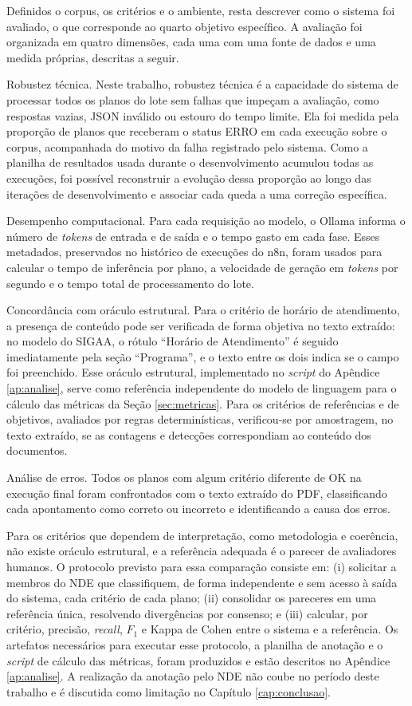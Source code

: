 Definidos o corpus, os critérios e o ambiente, resta descrever como o sistema foi avaliado, o que corresponde ao quarto objetivo específico. A avaliação foi organizada em quatro dimensões, cada uma com uma fonte de dados e uma medida próprias, descritas a seguir.

Robustez técnica. Neste trabalho, robustez técnica é a capacidade do sistema de processar todos os planos do lote sem falhas que impeçam a avaliação, como respostas vazias, JSON inválido ou estouro do tempo limite. Ela foi medida pela proporção de planos que receberam o status ERRO em cada execução sobre o corpus, acompanhada do motivo da falha registrado pelo sistema. Como a planilha de resultados usada durante o desenvolvimento acumulou todas as execuções, foi possível reconstruir a evolução dessa proporção ao longo das iterações de desenvolvimento e associar cada queda a uma correção específica.

Desempenho computacional. Para cada requisição ao modelo, o Ollama informa o número de \textit{tokens} de entrada e de saída e o tempo gasto em cada fase. Esses metadados, preservados no histórico de execuções do n8n, foram usados para calcular o tempo de inferência por plano, a velocidade de geração em \textit{tokens} por segundo e o tempo total de processamento do lote.

Concordância com oráculo estrutural. Para o critério de horário de atendimento, a presença de conteúdo pode ser verificada de forma objetiva no texto extraído: no modelo do SIGAA, o rótulo ``Horário de Atendimento'' é seguido imediatamente pela seção ``Programa'', e o texto entre os dois indica se o campo foi preenchido. Esse oráculo estrutural, implementado no \textit{script} do Apêndice \ref{ap:analise}, serve como referência independente do modelo de linguagem para o cálculo das métricas da Seção \ref{sec:metricas}. Para os critérios de referências e de objetivos, avaliados por regras determinísticas, verificou-se por amostragem, no texto extraído, se as contagens e detecções correspondiam ao conteúdo dos documentos.

Análise de erros. Todos os planos com algum critério diferente de OK na execução final foram confrontados com o texto extraído do PDF, classificando cada apontamento como correto ou incorreto e identificando a causa dos erros.

Para os critérios que dependem de interpretação, como metodologia e coerência, não existe oráculo estrutural, e a referência adequada é o parecer de avaliadores humanos. O protocolo previsto para essa comparação consiste em: (i) solicitar a membros do NDE que classifiquem, de forma independente e sem acesso à saída do sistema, cada critério de cada plano; (ii) consolidar os pareceres em uma referência única, resolvendo divergências por consenso; e (iii) calcular, por critério, precisão, \textit{recall}, $F_1$ e Kappa de Cohen entre o sistema e a referência. Os artefatos necessários para executar esse protocolo, a planilha de anotação e o \textit{script} de cálculo das métricas, foram produzidos e estão descritos no Apêndice \ref{ap:analise}. A realização da anotação pelo NDE não coube no período deste trabalho e é discutida como limitação no Capítulo \ref{cap:conclusao}.

